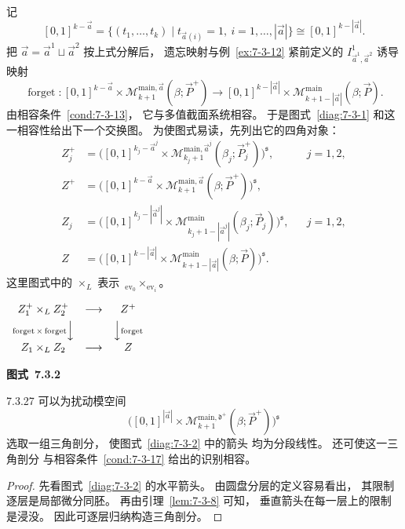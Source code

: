 记
\[
[0,1]^{k-\vec a}
=\bigl\{(t_1,\ldots,t_k)\mid
t_{\vec a(i)}=1,\ i=1,\ldots,|\vec a|\bigr\}
\cong[0,1]^{k-|\vec a|}.
\]
把 $\vec a=\vec a^1\sqcup\vec a^2$
按上式分解后，
遗忘映射与例~\ref{ex:7-3-12} 紧前定义的
$I^1_{\vec a^1,\vec a^2}$
诱导映射
\[
\operatorname{forget}\colon
[0,1]^{k-\vec a}\times
\mathcal M^{\mathrm{main},\vec a}_{k+1}
(\beta;\vec P^+)
\longrightarrow
[0,1]^{k-|\vec a|}\times
\mathcal M^{\mathrm{main}}_{k+1-|\vec a|}
(\beta;\vec P).
\]
由相容条件~\ref{cond:7-3-13}，
它与多值截面系统相容。
于是图式~\ref{diag:7-3-1}
和这一相容性给出下一个交换图。
为使图式易读，先列出它的四角对象：
\[
\begin{aligned}
Z_j^+
&=
\bigl([0,1]^{k_j-\vec a^j}\times
\mathcal M^{\mathrm{main},\vec a^j}_{k_j+1}
(\beta_j;\vec P_j^+)\bigr)^{\mathfrak s},
&&j=1,2,\\
Z^+
&=
\bigl([0,1]^{k-\vec a}\times
\mathcal M^{\mathrm{main},\vec a}_{k+1}
(\beta;\vec P^+)\bigr)^{\mathfrak s},\\
Z_j
&=
\bigl([0,1]^{k_j-|\vec a^j|}\times
\mathcal M^{\mathrm{main}}_{k_j+1-|\vec a^j|}
(\beta_j;\vec P_j)\bigr)^{\mathfrak s},
&&j=1,2,\\
Z
&=
\bigl([0,1]^{k-|\vec a|}\times
\mathcal M^{\mathrm{main}}_{k+1-|\vec a|}
(\beta;\vec P)\bigr)^{\mathfrak s}.
\end{aligned}
\]
这里图式中的 $\times_L$ 表示
$\,{}_{\operatorname{ev}_0}\times_{\operatorname{ev}_i}$。

\par\medskip\noindent\begin{minipage}{\textwidth}
\centering
$\displaystyle
\begin{array}{ccc}
Z_1^+\times_L Z_2^+&\longrightarrow&Z^+\\[0.4em]
{\scriptstyle\operatorname{forget}\times\operatorname{forget}}\Big\downarrow
&&
\Big\downarrow{\scriptstyle\operatorname{forget}}\\[0.4em]
Z_1\times_L Z_2&\longrightarrow&Z
\end{array}$
\par\smallskip
{\renewcommand{\thefigure}{7.3.2}
\normalfont\bfseries 图式~\thefigure\label{diag:7-3-2}}
\end{minipage}\par\medskip

\begin{lemma}{7.3.27}\label{lem:7-3-27}
可以为扰动模空间
\[
\bigl([0,1]^{|\vec a|}\times
\mathcal M^{\mathrm{main},\mathfrak d^+}_{k+1}
(\beta;\vec P^+)\bigr)^{\mathfrak s}
\]
选取一组三角剖分，
使图式~\ref{diag:7-3-2} 中的箭头
均为分段线性。
还可使这一三角剖分
与相容条件~\ref{cond:7-3-17}
给出的识别相容。
\end{lemma}

\begin{proof}
先看图式~\ref{diag:7-3-2} 的水平箭头。
由圆盘分层的定义容易看出，
其限制逐层是局部微分同胚。
再由引理~\ref{lem:7-3-8} 可知，
垂直箭头在每一层上的限制是浸没。
因此可逐层归纳构造三角剖分。
\end{proof}
